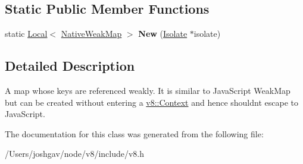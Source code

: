 \subsection*{Static Public Member Functions}
\begin{DoxyCompactItemize}
\item 
static \hyperlink{classv8_1_1_local}{Local}$<$ \hyperlink{classv8_1_1_native_weak_map}{Native\+Weak\+Map} $>$ {\bfseries New} (\hyperlink{classv8_1_1_isolate}{Isolate} $\ast$isolate)\hypertarget{classv8_1_1_native_weak_map_afeb513d14fbb8d4537e4a051c71fbf31}{}\label{classv8_1_1_native_weak_map_afeb513d14fbb8d4537e4a051c71fbf31}

\end{DoxyCompactItemize}


\subsection{Detailed Description}
A map whose keys are referenced weakly. It is similar to Java\+Script Weak\+Map but can be created without entering a \hyperlink{classv8_1_1_context}{v8\+::\+Context} and hence shouldn\textquotesingle{}t escape to Java\+Script. 

The documentation for this class was generated from the following file\+:\begin{DoxyCompactItemize}
\item 
/\+Users/joshgav/node/v8/include/v8.\+h\end{DoxyCompactItemize}
